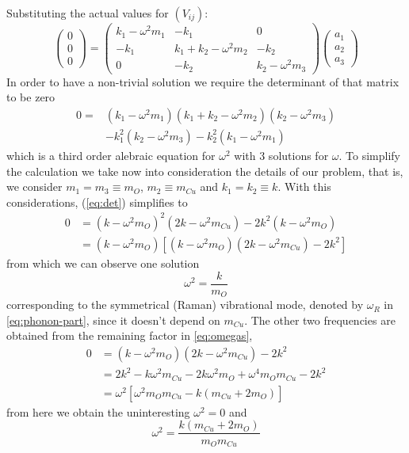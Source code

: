 %
Substituting the actual values for $(V_{ij})$:
%
\begin{equation}
  \left( 
    \begin{array}{c}
      0\\ 0\\ 0
    \end{array}
  \right) 
  = \left(
    \begin{array}{ccc}
      k_1-\omega^2m_1 & -k_1 & 0 \\ -k_1 & k_1+k_2-\omega^2m_2 & -k_2 \\ 0 & -k_2 & k_2-\omega^2m_3 
    \end{array}
  \right) 
  \left(
    \begin{array}{c}
      a_1 \\ a_2 \\ a_3 
    \end{array}
  \right)
\end{equation}
%
In order to have a non-trivial solution we require the determinant of that matrix to be zero
%
\begin{equation}
  \label{eq:det}
  \begin{split}
    0 = & (k_1-\omega^2m_1)(k_1+k_2-\omega^2m_2)(k_2-\omega^2m_3) \\
        & -k_1^2(k_2-\omega^2m_3)-k_2^2(k_1-\omega^2m_1)
  \end{split}
\end{equation}
%
which is a third order alebraic equation for $\omega^2$ with 3 solutions for $\omega$.
To simplify the calculation we take now into consideration the details of our problem, that is, we consider $m_1 = m_3 \equiv m_O$, $m_2 \equiv m_{Cu}$ and $k_1 = k_2 \equiv k$. 
With this considerations, (\ref{eq:det}) simplifies to
%
\begin{align}
  \label{eq:omegas}
  0 & = (k-\omega^2m_O)^2(2k-\omega^2m_{Cu})-2k^2(k-\omega^2m_O) \\
    & = (k-\omega^2m_O)[(k-\omega^2m_O)(2k-\omega^2m_{Cu})-2k^2]
\end{align}
%
from which we can observe one solution
%
\begin{equation}
  \omega^2= \frac{k}{m_O}
\end{equation}
%
corresponding to the symmetrical (Raman) vibrational mode, denoted by $\omega_{R}$ in \ref{eq:phonon-part}, since it doesn't depend on $m_{Cu}$.
The other two frequencies are obtained from the remaining factor in \ref{eq:omegas},
%
\begin{equation}
  \begin{split}
    0 & = (k-\omega^2m_O)(2k-\omega^2m_{Cu})-2k^2 \\
      & = 2k^2-k\omega^2m_{Cu}-2k\omega^2m_O+\omega^4m_Om_{Cu}-2k^2 \\
      & = \omega^2[\omega^2m_Om_{Cu}-k(m_{Cu}+2m_O)]
  \end{split}
\end{equation}
%
from here we obtain the uninteresting $\omega^2=0$ and
%
\begin{equation}
  \omega^2 = \frac{k(m_{Cu}+2m_O)}{m_Om_{Cu}}
\end{equation}


